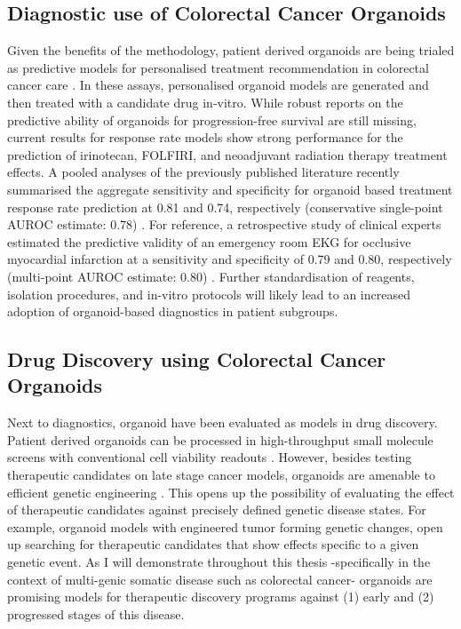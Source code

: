 \begin{flushleft}
\subsection{Diagnostic use of Colorectal Cancer Organoids}

Given the benefits of the methodology, patient derived organoids are being trialed as predictive models for personalised treatment recommendation in colorectal cancer care \cite{VanDeWetering2015, Vlachogiannis2018, ganeshRectalCancerOrganoid2019a, ooftPatientderivedOrganoidsCan2019a, yaoPatientDerivedOrganoidsPredict2020a}. In these assays, personalised organoid models are generated and then treated with a candidate drug in-vitro. While robust reports on the predictive ability of organoids for progression-free survival are still missing, current results for response rate models show strong performance for the prediction of irinotecan, FOLFIRI, and neoadjuvant radiation therapy treatment effects. A pooled analyses of the previously published literature recently summarised the aggregate sensitivity and specificity for organoid based treatment response rate prediction at 0.81 and 0.74, respectively (conservative single-point AUROC estimate: 0.78) \cite{wensinkPatientderivedOrganoidsPredictive2021, zhangNoteROCAnalysis2005}. For reference, a retrospective study of clinical experts estimated the predictive validity of an emergency room EKG for occlusive myocardial infarction at a sensitivity and specificity of 0.79 and 0.80, respectively (multi-point AUROC estimate: 0.80) \cite{al-zaitiMachineLearningECG2023}. Further standardisation of reagents, isolation procedures, and in-vitro protocols will likely lead to an increased adoption of organoid-based diagnostics in patient subgroups. \par

\subsection{Drug Discovery using Colorectal Cancer Organoids}

Next to diagnostics, organoid have been evaluated as models in drug discovery. Patient derived organoids can be processed in high-throughput small molecule screens with conventional cell viability readouts \cite{VanDeWetering2015}. However, besides testing therapeutic candidates on late stage cancer models, organoids are amenable to efficient genetic engineering \cite{Matano2015-zw, Drost2017-fu}. This opens up the possibility of evaluating the effect of therapeutic candidates against precisely defined genetic disease states. For example, organoid models with engineered tumor forming genetic changes, open up searching for therapeutic candidates that show effects specific to a given genetic event. As I will demonstrate throughout this thesis -specifically in the context of multi-genic somatic disease such as colorectal cancer- organoids are promising models for therapeutic discovery programs against (1) early and (2) progressed stages of this disease.


\end{flushleft}
